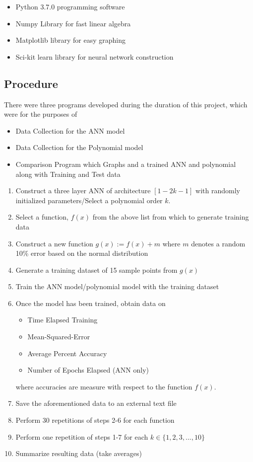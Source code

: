 \documentclass{article}
\begin{document}
\begin{itemize}
    \item Python 3.7.0 programming software
    \item Numpy Library for fast linear algebra
    \item Matplotlib library for easy graphing
    \item Sci-kit learn library for neural network construction
\end{itemize}

\subsection{Procedure}
There were three programs developed during the duration of this project, which were for the purposes of 
\begin{itemize}
    \item Data Collection for the ANN model
    \item Data Collection for the Polynomial model
    \item Comparison Program which Graphs and a trained ANN and polynomial along with Training and Test data
\end{itemize}

\begin{enumerate}
    \item Construct a three layer ANN of architecture $[1-2k-1]$ with randomly initialized parameters/Select a polynomial order $k$.
    \item Select a function, $f(x)$ from the above list from which to generate training data
    \item Construct a new function $g(x) := f(x) + m$ where $m$ denotes a random 10\% error based on the normal distribution
    \item Generate a training dataset of 15 sample points from $g(x)$
    \item Train the ANN model/polynomial model with the training dataset
    \item Once the model has been trained, obtain data on 
    \begin{itemize}
        \item Time Elapsed Training
        \item Mean-Squared-Error
        \item Average Percent Accuracy
        \item Number of Epochs Elapsed (ANN only)
    \end{itemize}
    where accuracies are measure with respect to the function $f(x)$.
    \item Save the aforementioned data to an external text file
    \item Perform 30 repetitions of steps 2-6 for each function
    \item Perform one repetition of steps 1-7 for each $k \in \{1, 2, 3, ..., 10\}$
    \item Summarize resulting data (take averages)
\end{enumerate}
\end{document}
